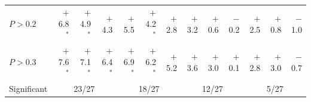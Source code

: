 \begin{table}[p]
\begin{tabular}{lrrrrrrrrrrrr}
$P>0.2$ & $+$6.8$^\ast$ & $+$4.9$^\ast$ & $+$4.3 & $+$5.5 & $+$4.2$^\ast$ & $+$2.8 & $+$3.2 & $+$0.6 & $-$0.2 & $+$2.5 & $+$0.8 & $-$1.0 \\
$P>0.3$ & $+$7.6$^\ast$ & $+$7.1$^\ast$ & $+$6.4$^\ast$ & $+$6.9$^\ast$ & $+$6.2$^\ast$ & $+$5.2 & $+$3.6 & $+$3.0 & $+$0.1 & $+$2.8 & $+$3.0 & $-$0.7 \\
\midrule
Significant & \multicolumn{3}{c}{23/27} & \multicolumn{3}{c}{18/27} & \multicolumn{3}{c}{12/27} & \multicolumn{3}{c}{5/27} \\
\bottomrule
\end{tabular}
\end{table}

